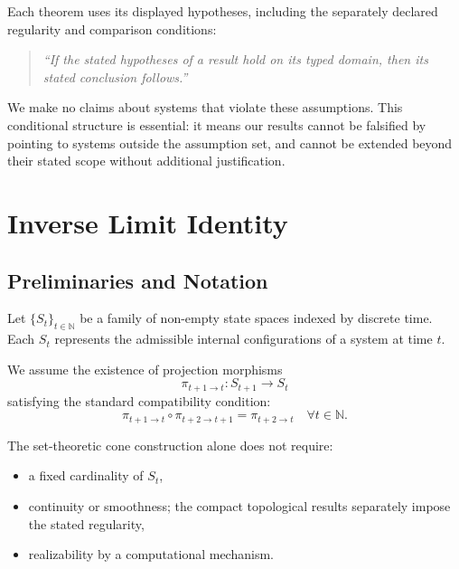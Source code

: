 \documentclass[11pt,a4paper]{article}
\theoremstyle{plain}
\theoremstyle{definition}
\theoremstyle{remark}
\begin{document}
Each theorem uses its displayed hypotheses, including the separately declared regularity and comparison conditions:

\begin{quote}
\textit{``If the stated hypotheses of a result hold on its typed domain, then its stated conclusion follows.''}
\end{quote}

We make no claims about systems that violate these assumptions. This conditional structure is essential: it means our results cannot be falsified by pointing to systems outside the assumption set, and cannot be extended beyond their stated scope without additional justification.

\section{Inverse Limit Identity}

\subsection{Preliminaries and Notation}

Let $\{S_t\}_{t \in \mathbb{N}}$ be a family of non-empty state spaces indexed by discrete time. Each $S_t$ represents the admissible internal configurations of a system at time $t$.

We assume the existence of projection morphisms
\begin{equation}
    \pi_{t+1 \to t}: S_{t+1} \to S_t
\end{equation}
satisfying the standard compatibility condition:
\begin{equation}
    \pi_{t+1 \to t} \circ \pi_{t+2 \to t+1} = \pi_{t+2 \to t} \quad \forall t \in \mathbb{N}.
\end{equation}

The set-theoretic cone construction alone does not require:
\begin{itemize}[leftmargin=*]
    \item a fixed cardinality of $S_t$,
    \item continuity or smoothness; the compact topological results separately impose the stated regularity,
    \item realizability by a computational mechanism.
\end{itemize}
\end{document}
